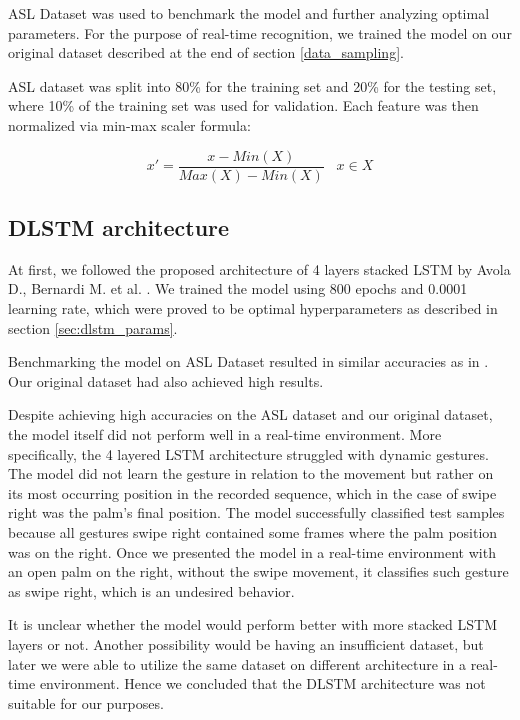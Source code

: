 ASL Dataset was used to benchmark the model and further analyzing optimal parameters. For the purpose of real-time recognition, we trained the model on our original dataset described at the end of section \ref{data_sampling}.

ASL dataset was split into 80\% for the training set and 20\% for the testing set, where 10\% of the training set was used for validation.  Each feature was then normalized via min-max scaler formula:

\begin{equation}
    { x' = \frac{x - Min(X)}{Max(X)-Min(X)}\;\;\; x \in X}
\end{equation}

\subsection{DLSTM architecture}

At first, we followed the proposed architecture of 4 layers stacked LSTM by Avola D., Bernardi M. et al. \cite{avola}. We trained the model using 800 epochs and 0.0001 learning rate, which were proved to be optimal hyperparameters as described in section \ref{sec:dlstm_params}.

Benchmarking the model on ASL Dataset resulted in similar accuracies as in \cite{avola}. Our original dataset had also achieved high results.

Despite achieving high accuracies on the ASL dataset and our original dataset, the model itself did not perform well in a real-time environment. More specifically, the 4 layered LSTM architecture struggled with dynamic gestures. The model did not learn the gesture in relation to the movement but rather on its most occurring position in the recorded sequence, which in the case of swipe right was the palm's final position. The model successfully classified test samples because all gestures swipe right contained some frames where the palm position was on the right. Once we presented the model in a real-time environment with an open palm on the right, without the swipe movement, it classifies such gesture as swipe right, which is an undesired behavior. 

It is unclear whether the model would perform better with more stacked LSTM layers or not. Another possibility would be having an insufficient dataset, but later we were able to utilize the same dataset on different architecture in a real-time environment. Hence we concluded that the DLSTM architecture was not suitable for our purposes.

